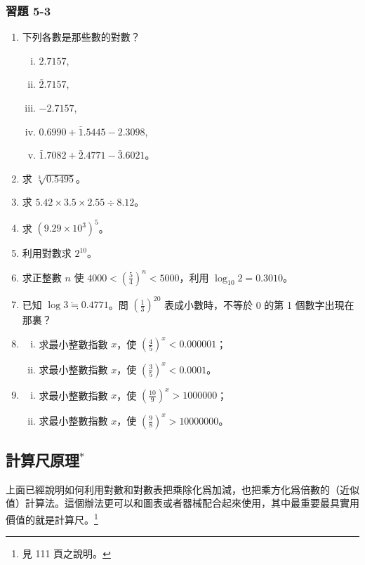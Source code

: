 \subsubsection*{習題 5-3}
\begin{enumerate}
    \item 下列各數是那些數的對數？
    \begin{enumerate}[(i)]
        \item $2.7157$,
        \item $\bar{2}.7157$,
        \item $-2.7157$,
        \item $0.6990 + \bar{1}.5445 - 2.3098$,
        \item $\bar{1}.7082 + \bar{2}.4771 - \bar{3}.6021$。
    \end{enumerate}
    \item 求 $\sqrt[3]{0.5495}$。
    \item 求 $5.42 \times 3.5 \times 2.55 \div 8.12$。
    \item 求 $(9.29 \times 10^3)^5$。
    \item 利用對數求 $2^{10}$。
    \item 求正整數 $n$ 使 $4000 < (\frac{5}{4})^n < 5000$，利用 $\log_{10} 2 = 0.3010$。
    \item 已知 $\log 3 \fallingdotseq 0.4771$。問 $(\frac{1}{3})^{20}$ 表成小數時，不等於 0 的第 1 個數字出現在那裏？
    \item 
    \begin{enumerate}[(i)]
        \item 求最小整數指數 $x$，使 $(\frac{4}{5})^x < 0.000001$；
        \item 求最小整數指數 $x$，使 $(\frac{3}{5})^x < 0.0001$。
    \end{enumerate}
    \item 
    \begin{enumerate}[(i)]
        \item 求最小整數指數 $x$，使 $(\frac{10}{9})^x > 1000000$；
        \item 求最小整數指數 $x$，使 $(\frac{9}{8})^x > 10000000$。
    \end{enumerate}
\end{enumerate}

\subsection{計算尺原理\texorpdfstring{$^*$}{*}}

上面已經說明如何利用對數和對數表把乘除化爲加減，也把乘方化爲倍數的（近似值）計算法。這個辦法更可以和圖表或者器械配合起來使用，其中最重要最具實用價值的就是計算尺。\footnote{見 111 頁之說明。}

